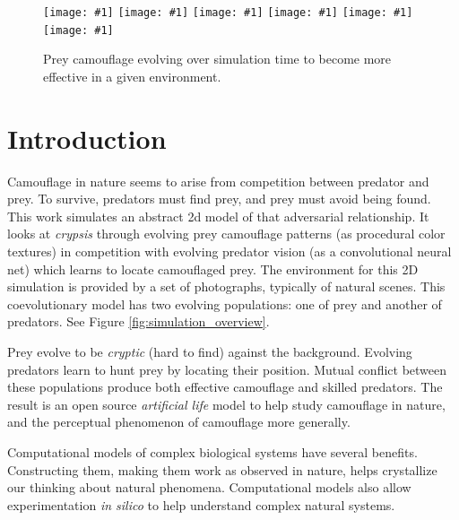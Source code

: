 \documentclass[sigconf]{acmart}
\newcommand{\jargon}[1]{\textit{#1}}
\newcommand{\igsix}[1]{\texttt{[image: \#1]}}
\begin{document}

\begin{figure}
    \igsix{20221030_1220_step_19.png}
    \hfill
    \igsix{20221030_1220_step_1045.png}
    \hfill
    \igsix{20221030_1220_step_2014.png}
    \hfill
    \igsix{20221030_1220_step_3059.png}
    \hfill
    \igsix{20221030_1220_step_6650.png}
    \hfill
    \igsix{20221030_1220_step_7467.png}
    \caption{Prey camouflage evolving over simulation time to become more effective in a given environment.}
    \label{fig:time_sequence}
\end{figure}


\section{Introduction}

Camouflage in nature seems to arise from competition between predator and prey. To survive, predators must find prey, and prey must avoid being found. This work simulates an abstract 2d model of that adversarial relationship. It looks at \jargon{crypsis} through evolving prey camouflage patterns (as procedural color textures) in competition with evolving predator vision (as a convolutional neural net) which learns to locate camouflaged prey. The environment for this 2D simulation is provided by a set of photographs, typically of natural scenes. This coevolutionary model has two evolving populations: one of prey and another of predators. See Figure \ref{fig:simulation_overview}.
\par
Prey evolve to be \jargon{cryptic} (hard to find) against the background. Evolving predators learn to hunt prey by locating their position. Mutual conflict between these populations produce both effective camouflage and skilled predators. The result is an open source \jargon{artificial life} model to help study camouflage in nature, and the perceptual phenomenon of camouflage more generally.
\par
Computational models of complex biological systems have several benefits. Constructing them, making them work as observed in nature, helps crystallize our thinking about natural phenomena. Computational models also allow experimentation \jargon{in silico} to help understand complex natural systems.
\par
\end{document}
